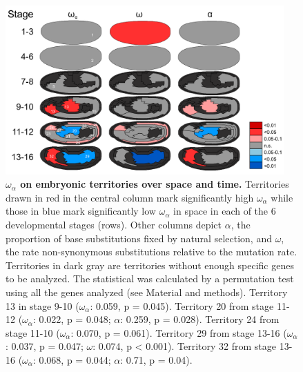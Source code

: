
\begin{figure}[t]
  \includegraphics[width=0.95\textwidth]{./Images/Art-III/OmegaA_territories.png}
  \centering
  \caption{\textbf{{\large$\omega_{\alpha}$} on embryonic territories over space and time.}
   Territories drawn in red in the central column mark significantly high $\omega_{\alpha}$ while those in blue mark significantly low $\omega_{\alpha}$ in space in each of the 6 developmental stages (rows). Other columns depict $\alpha$, the proportion of base substitutions fixed by natural selection, and $\omega$, the rate non-synonymous substitutions relative to the mutation rate. 
  Territories in dark gray are territories without enough specific genes to be analyzed. The statistical was calculated by a permutation test using all the genes analyzed (see Material and methods). Territory 13 in stage 9-10 ($\omega_{\alpha}$: 0.059, p = 0.045). Territory 20 from stage 11-12 ($\omega_{\alpha}$: 0.022, p = 0.048; $\alpha$: 0.259, p = 0.028). Territory 24 from stage 11-10 ($\omega_{\alpha}$: 0.070, p = 0.061). Territory 29 from stage 13-16 ($\omega_{\alpha}$: 0.037, p = 0.047; $\omega$: 0.074, p < 0.001). Territory 32 from stage 13-16 ($\omega_{\alpha}$: 0.068, p = 0.044; $\alpha$: 0.71, p = 0.04).
  }
  \label{fig:Art-III-OmegaA_territories}
\end{figure}

